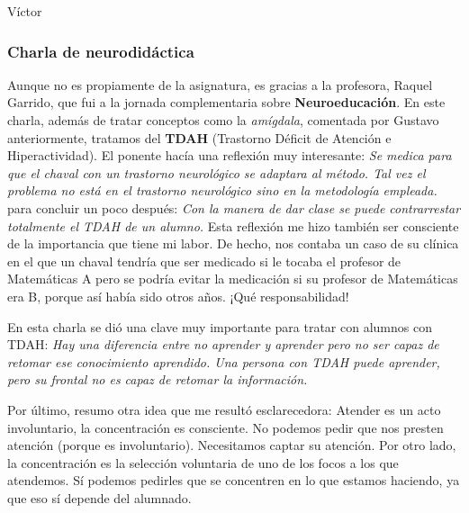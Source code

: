 \begin{opin}{\victorcolor}{Víctor}



\subsubsection{Charla de neurodidáctica}

Aunque no es propiamente de la asignatura, es gracias a la profesora, Raquel Garrido,  que fui a la jornada complementaria sobre \textbf{Neuroeducación}.
%
En este charla, además de tratar conceptos como la \textit{amígdala}, comentada por Gustavo anteriormente, tratamos del \textbf{TDAH} (Trastorno Déficit de Atención e Hiperactividad). 
%
El ponente hacía una reflexión muy interesante: \textit{Se medica para que el chaval con un trastorno neurológico se adaptara al método. 
%
Tal vez el problema no está en el trastorno neurológico sino en la metodología empleada.} para concluir un poco después: \textit{Con la manera de dar clase se puede contrarrestar totalmente el TDAH de un alumno.}
%
Esta reflexión me hizo también ser consciente de la importancia que tiene mi labor. 
%
De hecho, nos contaba un caso de su clínica en el que un chaval tendría que ser medicado si le tocaba el profesor de Matemáticas A pero se podría evitar la medicación si su profesor de Matemáticas era B, porque así había sido otros años. ¡Qué responsabilidad!

En esta charla se dió una clave muy importante para tratar con alumnos con TDAH:\textit{
Hay una diferencia entre no aprender y aprender pero no ser capaz de retomar ese conocimiento aprendido. 
%
Una persona con TDAH puede aprender, pero su frontal no es capaz de retomar la información.}

Por último, resumo otra idea que me resultó esclarecedora:
%
Atender es un acto involuntario, la concentración es consciente. 
%
No podemos pedir que nos presten atención (porque es involuntario). Necesitamos captar su atención. 
%
Por otro lado,
la concentración es la selección voluntaria de uno de los focos a los que atendemos. 
%
Sí podemos pedirles que se concentren en lo que estamos haciendo, ya que eso sí depende del alumnado.




\end{opin}

